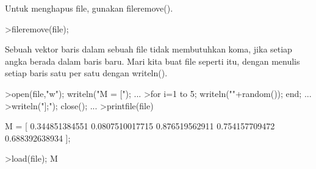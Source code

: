 \documentclass[a4paper,10pt]{article}
\begin{document}
\begin{eulernotebook}
\begin{eulercomment}
\begin{eulercomment}
\begin{eulercomment}
\begin{eulercomment}
\begin{eulercomment}
\begin{eulercomment}
\begin{eulercomment}
\begin{eulercomment}
\begin{eulercomment}
\begin{eulercomment}
\begin{eulercomment}
\begin{eulercomment}
\begin{eulercomment}
\begin{eulercomment}
\begin{eulercomment}
\begin{eulercomment}
\begin{eulercomment}
\begin{eulercomment}
\begin{eulercomment}
\begin{eulercomment}
\begin{eulercomment}
\begin{eulercomment}
\begin{eulercomment}
\begin{eulercomment}
\begin{eulercomment}
\begin{eulercomment}
\begin{eulercomment}
\begin{eulercomment}
\begin{eulercomment}
\begin{eulercomment}
\begin{eulercomment}
\begin{eulercomment}
\begin{eulercomment}
\begin{eulercomment}
\begin{eulercomment}
\begin{eulercomment}
\begin{eulercomment}
\begin{eulercomment}
\begin{eulercomment}
\begin{eulercomment}
\begin{eulercomment}
\begin{eulercomment}
\begin{eulercomment}
\begin{eulercomment}
\begin{eulercomment}
\begin{eulercomment}
\begin{eulercomment}
\begin{eulercomment}
\begin{eulercomment}
\begin{eulercomment}
\begin{euleroutput}
\end{euleroutput}
\begin{eulercomment}
Untuk menghapus file, gunakan fileremove().
\end{eulercomment}
\begin{eulerprompt}
>fileremove(file);
\end{eulerprompt}
\begin{eulercomment}
Sebuah vektor baris dalam sebuah file tidak membutuhkan koma, jika
setiap angka berada dalam baris baru. Mari kita buat file seperti itu,
dengan menulis setiap baris satu per satu dengan writeln().
\end{eulercomment}
\begin{eulerprompt}
>open(file,"w"); writeln("M = ["); ...
>for i=1 to 5; writeln(""+random()); end; ...
>writeln("];"); close(); ...
>printfile(file)
\end{eulerprompt}
\begin{euleroutput}
  M = [
  0.344851384551
  0.0807510017715
  0.876519562911
  0.754157709472
  0.688392638934
  ];
\end{euleroutput}
\begin{eulerprompt}
>load(file); M
\end{eulerprompt}

\end{eulercomment}
\end{eulercomment}
\end{eulercomment}
\end{eulercomment}
\end{eulercomment}
\end{eulercomment}
\end{eulercomment}
\end{eulercomment}
\end{eulercomment}
\end{eulercomment}
\end{eulercomment}
\end{eulercomment}
\end{eulercomment}
\end{eulercomment}
\end{eulercomment}
\end{eulercomment}
\end{eulercomment}
\end{eulercomment}
\end{eulercomment}
\end{eulercomment}
\end{eulercomment}
\end{eulercomment}
\end{eulercomment}
\end{eulercomment}
\end{eulercomment}
\end{eulercomment}
\end{eulercomment}
\end{eulercomment}
\end{eulercomment}
\end{eulercomment}
\end{eulercomment}
\end{eulercomment}
\end{eulercomment}
\end{eulercomment}
\end{eulercomment}
\end{eulercomment}
\end{eulercomment}
\end{eulercomment}
\end{eulercomment}
\end{eulercomment}
\end{eulercomment}
\end{eulercomment}
\end{eulercomment}
\end{eulercomment}
\end{eulercomment}
\end{eulercomment}
\end{eulercomment}
\end{eulercomment}
\end{eulercomment}
\end{eulercomment}
\end{eulernotebook}
\end{document}
